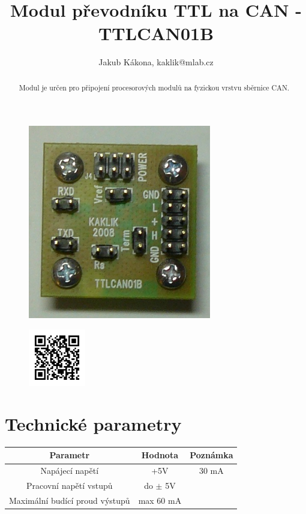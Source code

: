 \documentclass[12pt,a4paper,oneside]{article}
\begin{document}
\title{Modul převodníku TTL na CAN - TTLCAN01B}
\author{Jakub Kákona, kaklik@mlab.cz}
\maketitle

\thispagestyle{empty}
\begin{abstract}
Modul je určen pro připojení procesorových modulů na fyzickou vrstvu sběrnice CAN.
\end{abstract}

\begin{figure} [htbp]
\begin{center}
\includegraphics [width=80mm] {./img/TTLCAN01B_Top_Big.JPG} 
\end{center}
\end{figure}

\begin{figure} [b]
\includegraphics [width=25mm] {./img/TTLCAN01B_QRcode.png} 
\end{figure}

\newpage
\tableofcontents


\section{Technické parametry}
\begin{table}[htbp]
\begin{center}
\begin{tabular}{|c|c|c|}
\hline
\multicolumn{1}{|c|}{Parametr} & \multicolumn{1}{|c|}{Hodnota} & \multicolumn{1}{|c|}{Poznámka} \\ \hline
Napájecí napětí & +5V &  30 mA \\ \hline
Pracovní napětí  vstupů & do $\pm$ 5V &  \\ \hline
Maximální budící proud výstupů & max 60 mA & \\ \hline
\end{tabular}
\end{center}
\end{table}
\end{document}
